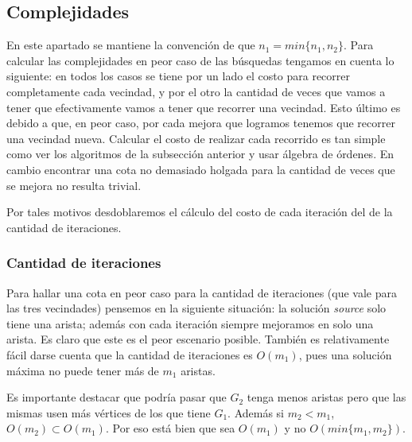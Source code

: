 \subsection{Complejidades}
En este apartado se mantiene la convención de que $n_1 = min\{n_1, n_2\}$.
Para calcular las complejidades en peor caso de las búsquedas tengamos en cuenta lo siguiente: en todos los casos se tiene por un lado el costo para recorrer completamente cada vecindad, y por el otro la cantidad de veces que vamos a tener que efectivamente vamos a tener que recorrer una vecindad. Esto último es debido a que, en peor caso, por cada mejora que logramos tenemos que recorrer una vecindad nueva. Calcular el costo de realizar cada recorrido es tan simple como ver los algoritmos de la subsección anterior y usar álgebra de órdenes. En cambio encontrar una cota no demasiado holgada para la cantidad de veces que se mejora no resulta trivial.

Por tales motivos desdoblaremos el cálculo del costo de cada iteración del de la cantidad de iteraciones.

\subsubsection{Cantidad de iteraciones}
Para hallar una cota en peor caso para la cantidad de iteraciones (que vale para las tres vecindades) pensemos en la siguiente situación: la solución \emph{source} solo tiene una arista; además con cada iteración siempre mejoramos en solo una arista. Es claro que este es el peor escenario posible. También es relativamente fácil darse cuenta que la cantidad de iteraciones es $O(m_1)$, pues una solución máxima no puede tener más de $m_1$ aristas.

Es importante destacar que podría pasar que $G_2$ tenga menos aristas pero que las mismas usen más vértices de los que tiene $G_1$. Además si $m_2 < m_1$, $O(m_2) \subset O(m_1)$. Por eso está bien que sea $O(m_1)$ y no $O(min\{m_1, m_2\})$.



